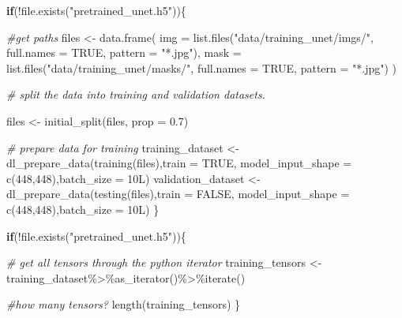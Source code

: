 \documentclass[
]{article}
\newenvironment{Shaded}{\begin{snugshade}}{\end{snugshade}}
\newcommand{\AttributeTok}[1]{\textcolor[rgb]{0.77,0.63,0.00}{#1}}
\newcommand{\CommentTok}[1]{\textcolor[rgb]{0.56,0.35,0.01}{\textit{#1}}}
\newcommand{\ConstantTok}[1]{\textcolor[rgb]{0.00,0.00,0.00}{#1}}
\newcommand{\ControlFlowTok}[1]{\textcolor[rgb]{0.13,0.29,0.53}{\textbf{#1}}}
\newcommand{\DecValTok}[1]{\textcolor[rgb]{0.00,0.00,0.81}{#1}}
\newcommand{\FloatTok}[1]{\textcolor[rgb]{0.00,0.00,0.81}{#1}}
\newcommand{\FunctionTok}[1]{\textcolor[rgb]{0.00,0.00,0.00}{#1}}
\newcommand{\NormalTok}[1]{#1}
\newcommand{\OtherTok}[1]{\textcolor[rgb]{0.56,0.35,0.01}{#1}}
\newcommand{\SpecialCharTok}[1]{\textcolor[rgb]{0.00,0.00,0.00}{#1}}
\newcommand{\StringTok}[1]{\textcolor[rgb]{0.31,0.60,0.02}{#1}}
\begin{document}
\begin{Shaded}
\begin{Highlighting}[]
\ControlFlowTok{if}\NormalTok{(}\SpecialCharTok{!}\FunctionTok{file.exists}\NormalTok{(}\StringTok{"pretrained\_unet.h5"}\NormalTok{))\{}
   
  \CommentTok{\#get paths}
\NormalTok{  files }\OtherTok{\textless{}{-}} \FunctionTok{data.frame}\NormalTok{(}
    \AttributeTok{img =} \FunctionTok{list.files}\NormalTok{(}\StringTok{"data/training\_unet/imgs/"}\NormalTok{, }\AttributeTok{full.names =} \ConstantTok{TRUE}\NormalTok{, }\AttributeTok{pattern =} \StringTok{"*.jpg"}\NormalTok{),}
    \AttributeTok{mask =} \FunctionTok{list.files}\NormalTok{(}\StringTok{"data/training\_unet/masks/"}\NormalTok{, }\AttributeTok{full.names =} \ConstantTok{TRUE}\NormalTok{, }\AttributeTok{pattern =} \StringTok{"*.jpg"}\NormalTok{)}
\NormalTok{  )}
  
  \CommentTok{\# split the data into training and validation datasets.}
  
\NormalTok{  files }\OtherTok{\textless{}{-}} \FunctionTok{initial\_split}\NormalTok{(files, }\AttributeTok{prop =} \FloatTok{0.7}\NormalTok{)}
  
  \CommentTok{\# prepare data for training}
\NormalTok{  training\_dataset }\OtherTok{\textless{}{-}} \FunctionTok{dl\_prepare\_data}\NormalTok{(}\FunctionTok{training}\NormalTok{(files),}\AttributeTok{train =} \ConstantTok{TRUE}\NormalTok{,}
                                      \AttributeTok{model\_input\_shape =} \FunctionTok{c}\NormalTok{(}\DecValTok{448}\NormalTok{,}\DecValTok{448}\NormalTok{),}\AttributeTok{batch\_size =}\NormalTok{ 10L)}
\NormalTok{  validation\_dataset }\OtherTok{\textless{}{-}} \FunctionTok{dl\_prepare\_data}\NormalTok{(}\FunctionTok{testing}\NormalTok{(files),}\AttributeTok{train =} \ConstantTok{FALSE}\NormalTok{,}
                                        \AttributeTok{model\_input\_shape =} \FunctionTok{c}\NormalTok{(}\DecValTok{448}\NormalTok{,}\DecValTok{448}\NormalTok{),}\AttributeTok{batch\_size =}\NormalTok{ 10L)}
\NormalTok{\}}
\end{Highlighting}
\end{Shaded}

\begin{Shaded}
\begin{Highlighting}[]
\ControlFlowTok{if}\NormalTok{(}\SpecialCharTok{!}\FunctionTok{file.exists}\NormalTok{(}\StringTok{"pretrained\_unet.h5"}\NormalTok{))\{}
   
  \CommentTok{\# get all tensors through the python iterator}
\NormalTok{  training\_tensors }\OtherTok{\textless{}{-}}\NormalTok{ training\_dataset}\SpecialCharTok{\%\textgreater{}\%}\FunctionTok{as\_iterator}\NormalTok{()}\SpecialCharTok{\%\textgreater{}\%}\FunctionTok{iterate}\NormalTok{()}
  
  \CommentTok{\#how many tensors?}
  \FunctionTok{length}\NormalTok{(training\_tensors)}
\NormalTok{\}}
\end{Highlighting}
\end{Shaded}
\end{document}

